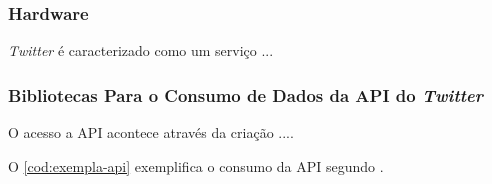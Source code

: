 \subsubsection{Hardware}\label{subsub-hardw}
\textit{Twitter} é caracterizado como um serviço ...


\subsubsection{Bibliotecas Para o Consumo de Dados da API do \textit{Twitter}}
O acesso a API acontece através da criação ....

O \autoref{cod:exempla-api} exemplifica o consumo da API segundo .

\codigoPython






